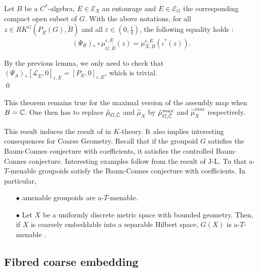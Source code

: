 
\begin{thm}\label{BCCeq}
Let $B$ be a $C^*$-algebra, $E\in \mathcal E_X$ an entourage and $\overline E \in \mathcal E_G$ the corresponding compact open subset of $G$. With the above notations, for all $z\in RK^G(P_{\overline E}(G),\tilde B)$ and all $\varepsilon\in(0,\frac{1}{4})$, the following equality holds :
\[(\Psi_B)_*\circ\mu^{\epsilon,\overline E}_{G,\tilde B} (z) = \mu_{X,B}^{\epsilon,E}(\iota^*(z)).\]
\end{thm}

\begin{dem}
By the previous lemma, we only need to check that $(\Psi_A)_*[\mathcal L_{\overline E},0]_{\varepsilon,\overline  E} = [P_{E},0]_{\varepsilon, E} $, which is trivial.\\
\qed
\end{dem}

\begin{rk}
This theorem remains true for the maximal version of the assembly map when $B=\mathbb C$. One then has to replace $\hat\mu_{G,\tilde {\mathbb C}}$ and $\hat\mu_{X}$ by $\hat\mu^{max}_{G,\tilde {\mathbb C}}$ and $\hat\mu^{max}_{X}$ respectively.
\end{rk}

This result induces the result of \cite{SkTuYu} in $K$-theory. It also implies interesting consequences for Coarse Geometry. Recall that if the groupoid $G$ satisfies the Baum-Connes conjecture with coefficients, it satisfies the controlled Baum-Connes conjecture. Interesting examples follow from the result of J-L. Tu \cite{TuThese} that a-$T$-menable groupoids satisfy the Baum-Connes conjecture with coefficients. In particular, \\

\begin{itemize}
\item[$\bullet$] amenable groupoids are a-$T$-menable.\\
\item[$\bullet$] Let $X$ be a uniformly discrete metric space with bounded geometry. Then, if $X$ is coarsely embeddable into a separable Hilbert space, $G(X)$ is a-$T$-menable \cite{SkTuYu}. \\
\end{itemize}

\subsection{Fibred coarse embedding}

